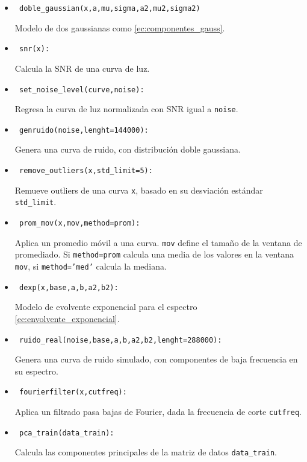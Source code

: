 \begin{itemize}
\item \begin{verbatim} doble_gaussian(x,a,mu,sigma,a2,mu2,sigma2) \end{verbatim} Modelo de dos gaussianas como \ref{ec:componentes_gauss}.
	\item \begin{verbatim} snr(x): \end{verbatim} Calcula la SNR de una curva de luz.
	\item \begin{verbatim} set_noise_level(curve,noise): \end{verbatim} Regresa la curva de luz normalizada con SNR igual a \texttt{noise}.
	\item \begin{verbatim} genruido(noise,lenght=144000): \end{verbatim} Genera una curva de ruido, con distribución doble gaussiana.
	\item \begin{verbatim} remove_outliers(x,std_limit=5): \end{verbatim} Remueve outliers de una curva \texttt{x}, basado en su desviación estándar \texttt{std\_limit}.
	\item \begin{verbatim} prom_mov(x,mov,method=prom): \end{verbatim} Aplica un promedio móvil a una curva. \texttt{mov} define el tamaño de la ventana de promediado. Si \texttt{method=prom} calcula una media de los valores en la ventana \texttt{mov}, si \texttt{method='med'} calcula la mediana.
	\item \begin{verbatim} dexp(x,base,a,b,a2,b2): \end{verbatim} Modelo de evolvente exponencial para el espectro \ref{ec:envolvente_exponencial}.
	\item \begin{verbatim} ruido_real(noise,base,a,b,a2,b2,lenght=288000): \end{verbatim} Genera una curva de ruido simulado, con componentes de baja frecuencia en su espectro.
	\item \begin{verbatim} fourierfilter(x,cutfreq): \end{verbatim} Aplica un filtrado pasa bajas de Fourier, dada la frecuencia de corte \texttt{cutfreq}.
	\item \begin{verbatim} pca_train(data_train): \end{verbatim} Calcula las componentes principales de la matriz de datos \texttt{data\_train}.

\end{itemize}
